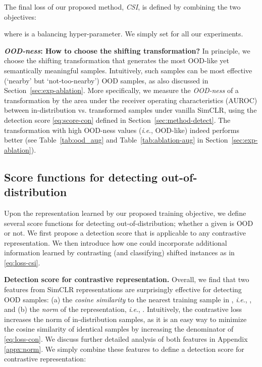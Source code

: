 \documentclass{article}
\newcommand{\ie}{\textit{i}.\textit{e}.}
\begin{document}
The final loss of our proposed method, \emph{CSI}, is defined by combining the two objectives:

where  is a balancing hyper-parameter. We simply set  for all our experiments.

\textbf{\textit{OOD-ness}: How to choose the shifting transformation?}
In principle, we choose the shifting transformation that generates the most OOD-like yet semantically meaningful samples. Intuitively, such samples can be most effective (‘nearby’ but ‘not-too-nearby’) OOD samples, as also discussed in Section~\ref{sec:exp-ablation}. More specifically, we measure the \textit{OOD-ness} of a transformation by the area under the receiver operating characteristics (AUROC) between in-distribution vs. transformed samples under vanilla SimCLR, using the detection score \eqref{eq:score-con} defined in Section~\ref{sec:method-detect}. The transformation with high OOD-ness values (\ie, OOD-like) indeed performs better (see Table~\ref{tab:ood_aug} and Table~\ref{tab:ablation-aug} in Section~\ref{sec:exp-ablation}).


\vspace{-0.05in}
\subsection{Score functions for detecting out-of-distribution}
\vspace{-0.05in}
\label{sec:method-detect}

Upon the representation  learned by our proposed training objective, we define several score functions for detecting out-of-distribution; whether a given  is OOD or not. We first propose a detection score that is applicable to any contrastive representation. We then introduce how one could incorporate additional information learned by contrasting (and classifying) shifted instances as in \eqref{eq:loss-csi}.


\textbf{Detection score for contrastive representation.}
Overall, we find that two features from SimCLR representations are surprisingly effective for detecting OOD samples: (a) the \emph{cosine similarity} to the nearest training sample in , \ie, , and (b) the \emph{norm} of the representation, \ie, . Intuitively, the contrastive loss increases the norm of in-distribution samples, as it is an easy way to minimize the cosine similarity of identical samples by increasing the denominator of \eqref{eq:loss-con}. We discuss further detailed analysis of both features in Appendix \ref{appx:norm}. We simply combine these features to define a detection score  for contrastive representation:
\end{document}
